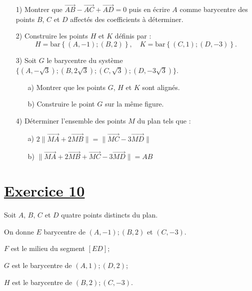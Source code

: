 \documentclass[12pt]{article}
\begin{document}
\begin{enumerate}
    \item[1)] Montrer que \( \overrightarrow{AB} - \overrightarrow{AC} + \overrightarrow{AD} = 0 \) puis en écrire \( A \) comme barycentre des points \( B \), \( C \) et \( D \) affectés des coefficients à déterminer. 
    
    \item[2)] Construire les points \( H \) et \( K \) définis par :
    \[
    H = \text{bar}\left\lbrace (A, -1); (B, 2) \right\rbrace , \quad K = \text{bar}\left\lbrace (C, 1); (D, -3) \right\rbrace .
    \] 
    
    \item[3)] Soit \( G \) le barycentre du système \( \{ (A, -\sqrt{3}); (B, 2\sqrt{3}); (C, \sqrt{3}); (D, -3\sqrt{3}) \} \).
    \begin{enumerate}
        \item[a)] Montrer que les points \( G \), \( H \) et \( K \) sont alignés. 
        \item[b)] Construire le point \( G \) sur la même figure.
    \end{enumerate}
    
    \item[4)] Déterminer l’ensemble des points \( M \) du plan tels que :
    \begin{enumerate}
        \item[a)] \( 2 \| \overrightarrow{MA} + 2 \overrightarrow{MB} \| = \| \overrightarrow{MC} - 3 \overrightarrow{MD} \| \)
        \item[b)] \( \| \overrightarrow{MA} + 2 \overrightarrow{MB} + \overrightarrow{MC} - 3 \overrightarrow{MD} \| = AB \)
    \end{enumerate}
\end{enumerate}

\section*{\underline{Exercice 10}}

Soit \( A \), \( B \), \( C \) et \( D \) quatre points distincts du plan. 
 
On donne \( E \) barycentre de \( (A, -1); (B, 2) \) et \( (C, -3) \). 
 
\( F \) est le milieu du segment \( [ED] \);  

\( G \) est le barycentre de \( (A, 1); (D, 2) \);  

\( H \) est le barycentre de \( (B, 2); (C, -3) \).
\end{document}

